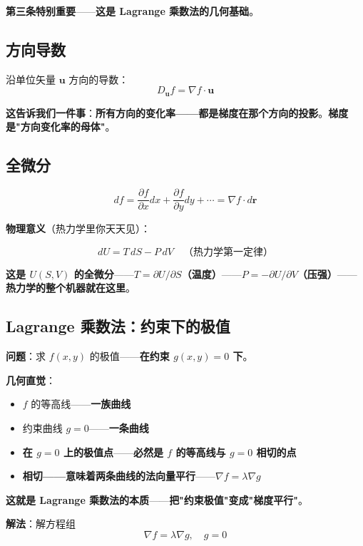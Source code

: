 \textbf{第三条特别重要}——\textbf{这是 Lagrange 乘数法的几何基础}。

\subsection{方向导数}

沿单位矢量 $\bm{u}$ 方向的导数：
\[
D_{\bm{u}} f = \nabla f \cdot \bm{u}
\]

\textbf{这告诉我们一件事}：\textbf{所有方向的变化率——都是梯度在那个方向的投影}。\textbf{梯度是"方向变化率的母体"}。

\subsection{全微分}

\begin{equation}
df = \frac{\partial f}{\partial x} dx + \frac{\partial f}{\partial y} dy + \cdots = \nabla f \cdot d\bm{r}
\end{equation}

\textbf{物理意义}（热力学里你天天见）：

\[
dU = T \, dS - P \, dV \quad \text{（热力学第一定律）}
\]

\textbf{这是 $U(S, V)$ 的全微分}——\textbf{$T = \partial U / \partial S$（温度）}——\textbf{$P = -\partial U / \partial V$（压强）}——\textbf{热力学的整个机器就在这里}。

\subsection{Lagrange 乘数法：约束下的极值}

\textbf{问题}：求 $f(x,y)$ 的极值——\textbf{在约束 $g(x,y) = 0$ 下}。

\textbf{几何直觉}：

\begin{itemize}
\item $f$ 的等高线——\textbf{一族曲线}
\item 约束曲线 $g=0$——\textbf{一条曲线}
\item \textbf{在 $g=0$ 上的极值点}——\textbf{必然是 $f$ 的等高线与 $g=0$ 相切的点}
\item \textbf{相切——意味着两条曲线的法向量平行}——\textbf{$\nabla f = \lambda \nabla g$}
\end{itemize}

\textbf{这就是 Lagrange 乘数法的本质}——\textbf{把"约束极值"变成"梯度平行"}。

\textbf{解法}：解方程组
\[
\nabla f = \lambda \nabla g, \quad g = 0
\]

